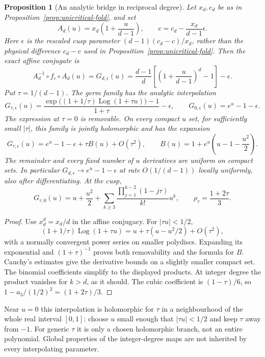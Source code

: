 \documentclass[11pt]{article}
\newtheorem{proposition}[theorem]{Proposition}
\newcommand{\Log}{\operatorname{Log}}
\begin{document}
\begin{proposition}[An analytic bridge in reciprocal degree]
\label{prop:degree-bridge}
Let $x_d,c_d$ be as in Proposition~\ref{prop:unicritical-fold}, and set
\[
 A_d(u)=x_d\left(1+\frac{u}{d-1}\right),\qquad
 c=c_d-\frac{x_d}{d-1}\epsilon.
\]
Here $\epsilon$ is the rescaled cusp parameter
$(d-1)(c_d-c)/x_d$, rather than the physical difference $c_d-c$ used
in Proposition~\ref{prop:unicritical-fold}.
Then the exact affine conjugate is
\[
 A_d^{-1}\circ f_c\circ A_d(u)=G_{d,\epsilon}(u)
 =\frac{d-1}{d}\left[\left(1+\frac{u}{d-1}\right)^d-1\right]-\epsilon.
\]
Put $\tau=1/(d-1)$. The germ family has the analytic interpolation
\[
 G_{\tau,\epsilon}(u)
 =\frac{\exp\bigl((1+1/\tau)\Log(1+\tau u)\bigr)-1}{1+\tau}
       -\epsilon,\qquad
 G_{0,\epsilon}(u)=e^u-1-\epsilon.
\]
The expression at $\tau=0$ is removable. On every compact $u$ set,
for sufficiently small $|\tau|$, this family is jointly holomorphic
and has the expansion
\[
 G_{\tau,\epsilon}(u)=e^u-1-\epsilon+\tau B(u)+O(\tau^2),\qquad
 B(u)=1+e^u\left(u-1-\frac{u^2}{2}\right).
\]
The remainder and every fixed number of $u$ derivatives are uniform
on compact sets. In particular $G_{d,\epsilon}\to e^u-1-\epsilon$
at rate $O(1/(d-1))$ locally uniformly, also after differentiating.
At the cusp,
\[
 G_{\tau,0}(u)=u+\frac{u^2}{2}
 +\sum_{k\ge3}\frac{\prod_{j=1}^{k-2}(1-j\tau)}{k!}u^k,
 \qquad \rho_\tau=\frac{1+2\tau}{3}.
\]
\end{proposition}
\begin{proof}
Use $x_d^d=x_d/d$ in the affine conjugacy. For $|\tau u|<1/2$,
\[
 (1+1/\tau)\Log(1+\tau u)
 =u+\tau(u-u^2/2)+O(\tau^2),
\]
with a normally convergent power series on smaller polydiscs.
Expanding its exponential and $(1+\tau)^{-1}$ proves both
removability and the formula for $B$. Cauchy's estimates give the
derivative bounds on a slightly smaller compact set. The binomial
coefficients simplify to the displayed products. At integer degree
the product vanishes for $k>d$, as it should. The cubic coefficient
is $(1-\tau)/6$, so $1-a_3/(1/2)^2=(1+2\tau)/3$.
\end{proof}
Near $u=0$ this interpolation is holomorphic for $\tau$ in a
neighbourhood of the whole real interval $[0,1]$: choose $u$ small
enough that $|\tau u|<1/2$ and keep $\tau$ away from $-1$.
For generic $\tau$ it is only a chosen holomorphic branch, not an
entire polynomial. Global properties of the integer-degree maps
are not inherited by every interpolating parameter.
\end{document}
